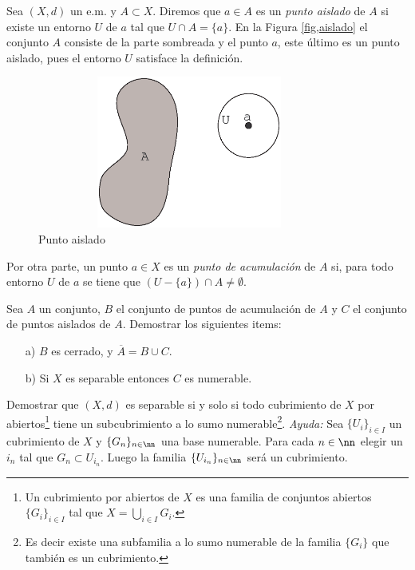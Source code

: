 \begin{ejercicio} Sea $(X,d)$ un e.m. y $A\subset X$. Diremos que
$a\in A$ es un \emph{punto aislado} de $A$ si existe un entorno
$U$ de $a$ tal que $U\cap A=\{a\}$. En la Figura
\vref{fig,aislado} el conjunto $A$ consiste de la parte sombreada
y el punto $a$, este \'ultimo es un punto aislado, pues el entorno
$U$ satisface la definici\'on.

\begin{figure}[h]
\begin{center}
    \includegraphics[height=5cm, width=10cm]{aislado.eps}
    \caption{Punto aislado}\label{fig,aislado}
\end{center}
\end{figure}


Por otra parte, un punto $a\in X$ es un \emph{punto de
acumulaci\'on} de $A$ si, para todo entorno $U$ de $a$ se tiene
que $(U-\{a\})\cap A\neq\emptyset$.

Sea $A$ un conjunto, $B$ el conjunto de puntos de acumulaci\'on de
$A$ y $C$ el conjunto de puntos aislados de $A$. Demostrar los
siguientes items:
\begin{itemize}
    \item[a)] $B$ es cerrado, y $\overline{A}=B\cup C$.
    \item[b)] Si $X$ es separable entonces $C$ es numerable.
\end{itemize}
\end{ejercicio}

\begin{ejercicio} Demostrar que $(X,d)$ es separable si y solo si
 todo cubrimiento de $X$ por abiertos\footnote{Un cubrimiento por
abiertos de $X$ es una familia de conjuntos abiertos
$\{G_i\}_{i\in I}$ tal que $X=\bigcup_{i\in I}G_i$.} tiene un
subcubrimiento a lo sumo numerable\footnote{Es decir existe una
subfamilia a lo sumo numerable de la familia $\{G_i\}$ que
tambi\'en es un cubrimiento.}. \emph{Ayuda:} Sea $\{U_i\}_{i\in
I}$ un cubrimiento de $X$ y $\{G_n\}_{n\in\nn}$ una base
numerable. Para cada $n\in\nn$ elegir un $i_n$ tal que $G_n\subset
U_{i_n}$. Luego la familia $\{U_{i_n}\}_{n\in\nn}$ ser\'a un
cubrimiento.
\end{ejercicio}


